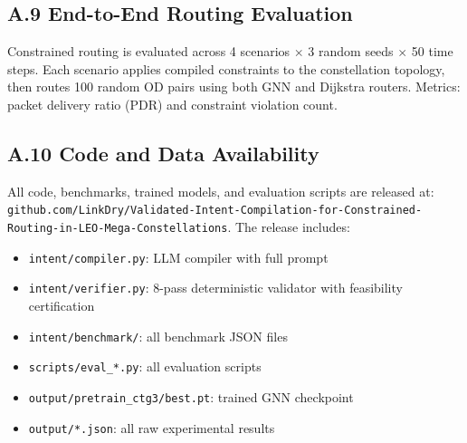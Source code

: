 \subsection*{A.9 End-to-End Routing Evaluation}

Constrained routing is evaluated across 4 scenarios $\times$ 3 random
seeds $\times$ 50 time steps. Each scenario applies compiled constraints
to the constellation topology, then routes 100 random OD pairs using
both GNN and Dijkstra routers. Metrics: packet delivery ratio (PDR)
and constraint violation count.

\subsection*{A.10 Code and Data Availability}

All code, benchmarks, trained models, and evaluation scripts are
released at: \texttt{github.com/LinkDry/Validated-Intent-Compilation-for-Constrained-Routing-in-LEO-Mega-Constellations}. The release includes:
\begin{itemize}
\item \texttt{intent/compiler.py}: LLM compiler with full prompt
\item \texttt{intent/verifier.py}: 8-pass deterministic validator with feasibility certification
\item \texttt{intent/benchmark/}: all benchmark JSON files
\item \texttt{scripts/eval\_*.py}: all evaluation scripts
\item \texttt{output/pretrain\_ctg3/best.pt}: trained GNN checkpoint
\item \texttt{output/*.json}: all raw experimental results
\end{itemize}
